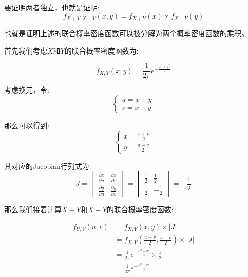 \documentclass[a4,10pt]{ctexart}
\begin{document}
\begin{qj}
    要证明两者独立，也就是证明:
\begin{equation}
    f_{X+Y, X-Y}(x,y) = f_{X+Y}(x) \times f_{X-Y}(y)
\end{equation}


也就是证明上述的联合概率密度函数可以被分解为两个概率密度函数的乘积。

首先我们考虑$X$和$Y$的联合概率密度函数为:

\begin{equation}
    f_{X,Y}(x,y) = \frac{1}{2\pi} e^{-\frac{x^2+y^2}{2}}    
\end{equation}

考虑换元，令:\
\begin{equation}
    \begin{cases}
        u = x+y \\
        v = x-y
    \end{cases}
\end{equation}

那么可以得到:
\begin{equation}
    \begin{cases}
        x = \frac{u+v}{2} \\
        y = \frac{u-v}{2}
    \end{cases}
\end{equation}

其对应的Jacobian行列式为:
\begin{equation}
    J = \begin{vmatrix}
        \frac{\partial x}{\partial u} & \frac{\partial x}{\partial v} \\
        \frac{\partial y}{\partial u} & \frac{\partial y}{\partial v}
    \end{vmatrix} = \begin{vmatrix}
        \frac{1}{2} & \frac{1}{2} \\
        \frac{1}{2} & -\frac{1}{2}
    \end{vmatrix} = -\frac{1}{2}
\end{equation}

那么我们接着计算$X+Y$和$X-Y$的联合概率密度函数:

\begin{align}
    f_{U, V}(u,v) &= f_{X,Y}(x,y) \times |J| \\
    &= f_{X,Y}(\frac{u+v}{2}, \frac{u-v}{2}) \times |J| \\
    &= \frac{1}{2\pi} e^{-\frac{u^2+v^2}{4}} \times \frac{1}{2} \\
    &= \frac{1}{4\pi} e^{-\frac{u^2+v^2}{4}}
\end{align}


\end{qj}
\end{document}
